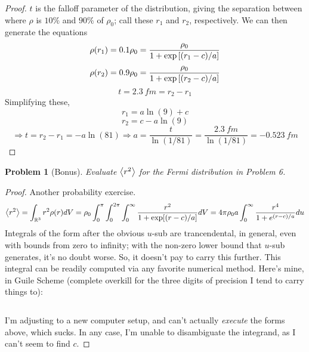 \documentclass{article}
\newtheorem{plm}{Problem}
\begin{document}
\begin{proof}
  $t$ is the falloff parameter of the distribution, giving the separation between where $\rho$ is $10\%$ and $90\%$ of $\rho_{0}$;
  call these $r_{1}$ and $r_{2}$, respectively.
  We can then generate the equations
  \[
    \rho(r_{1}) = 0.1\rho_{0} = \frac{\rho_{0}}{1 + \exp\qty[(r_{1} - c) / a]}
  \]
  \[
    \rho(r_{2}) = 0.9\rho_{0} = \frac{\rho_{0}}{1 + \exp\qty[(r_{2} - c) / a]}
  \]
  \[
    t = \SI{2.3}{fm} = r_{2} - r_{1}
  \]
  Simplifying these,
  \[
    r_{1} = a\ln(9) + c
  \]
  \[
    r_{2} = c -  a\ln(9)
  \]
  \[
    \Rightarrow t = r_{2} - r_{1} = -a\ln(81) \Rightarrow a = \frac{t}{\ln(1/81)}
    = \frac{\SI{2.3}{fm}}{\ln(1/81)} = \SI{-0.523}{fm}
  \]

\end{proof}

\begin{plm}[Bonus]
  Evaluate $\expval{r^{2}}$ for the Fermi distribution in Problem 6.
\end{plm}

\begin{proof}
  Another probability exercise.
  \[
    \expval{r^{2}} = \int_{\mathbb{R}^{3}}r^{2}\rho(r)dV = \rho_{0}\int_{0}^{\pi}\int_{0}^{2\pi}\int_{0}^{\infty}\frac{r^{2}}{1 + \exp[(r - c) / a]}dV
    = 4\pi\rho_{0}a\int_{0}^{\infty}\frac{r^{4}}{1 + e^{(r - c) / a}}du
  \]
  Integrals of the form after the obvious $u$-sub are trancendental, in general, even with bounds from zero to infinity;
  with the non-zero lower bound that $u$-sub generates, it's no doubt worse.
  So, it doesn't pay to carry this further.
  This integral can be readily computed via any favorite numerical method.
  Here's mine, in Guile Scheme (complete overkill for the three digits of precision I tend to carry things to):
  \inputminted[mathescape]{scheme}{integrate.scm}
  I'm adjusting to a new computer setup, and can't actually \textit{execute} the forms above, which sucks.
  In any case, I'm unable to disambiguate the integrand, as I can't seem to find $c$.
\end{proof}
\end{document}
